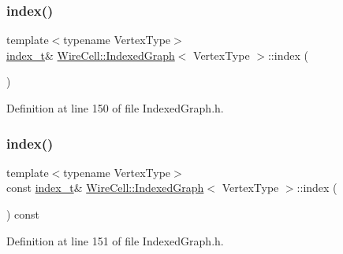 \subsubsection{\texorpdfstring{index()}{index()}\hspace{0.1cm}{\footnotesize\ttfamily [1/2]}}
{\footnotesize\ttfamily template$<$typename Vertex\+Type$>$ \\
\hyperlink{class_wire_cell_1_1_indexed_graph_aae3465237209e244b48b594b6284526e}{index\+\_\+t}\& \hyperlink{class_wire_cell_1_1_indexed_graph}{Wire\+Cell\+::\+Indexed\+Graph}$<$ Vertex\+Type $>$\+::index (\begin{DoxyParamCaption}{ }\end{DoxyParamCaption})\hspace{0.3cm}{\ttfamily [inline]}}



Definition at line 150 of file Indexed\+Graph.\+h.

\mbox{\label{class_wire_cell_1_1_indexed_graph_af2f586142f41e1316192a4768f04c4b1}} 
\subsubsection{\texorpdfstring{index()}{index()}\hspace{0.1cm}{\footnotesize\ttfamily [2/2]}}
{\footnotesize\ttfamily template$<$typename Vertex\+Type$>$ \\
const \hyperlink{class_wire_cell_1_1_indexed_graph_aae3465237209e244b48b594b6284526e}{index\+\_\+t}\& \hyperlink{class_wire_cell_1_1_indexed_graph}{Wire\+Cell\+::\+Indexed\+Graph}$<$ Vertex\+Type $>$\+::index (\begin{DoxyParamCaption}{ }\end{DoxyParamCaption}) const\hspace{0.3cm}{\ttfamily [inline]}}



Definition at line 151 of file Indexed\+Graph.\+h.

\mbox{\label{class_wire_cell_1_1_indexed_graph_a172ae52877eb8727d2580e199b41cc64}} 
